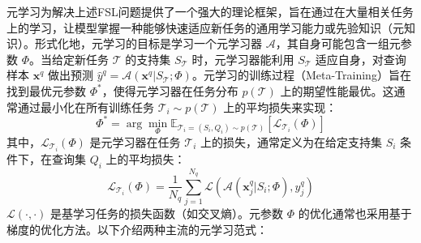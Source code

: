 元学习为解决上述FSL问题提供了一个强大的理论框架，旨在通过在大量相关任务上的学习，让模型掌握一种能够快速适应新任务的通用学习能力或先验知识（元知识）。形式化地，元学习的目标是学习一个元学习器 $\mathcal{A}$，其自身可能包含一组元参数 $\Phi$。当给定新任务 $\mathcal{T}$ 的支持集 $S_{\mathcal{T}}$ 时，元学习器能利用 $S_{\mathcal{T}}$ 适应自身，对查询样本 $\mathbf{x}^q$ 做出预测 $\hat{y}^q = \mathcal{A}(\mathbf{x}^q | S_{\mathcal{T}}; \Phi)$。元学习的训练过程（Meta-Training）旨在找到最优元参数 $\Phi^*$，使得元学习器在任务分布 $p(\mathcal{T})$ 上的期望性能最优。这通常通过最小化在所有训练任务 $\mathcal{T}_i \sim p(\mathcal{T})$ 上的平均损失来实现：
\begin{equation}
    \Phi^* = \arg\min_{\Phi} \mathbb{E}_{\mathcal{T}_i=(S_i, Q_i) \sim p(\mathcal{T})} [\mathcal{L}_{\mathcal{T}_i}(\Phi)]
    \label{eq:meta_objective}
\end{equation}
其中，$\mathcal{L}_{\mathcal{T}_i}(\Phi)$ 是元学习器在任务 $\mathcal{T}_i$ 上的损失，通常定义为在给定支持集 $S_i$ 条件下，在查询集 $Q_i$ 上的平均损失：
\begin{equation}
    \mathcal{L}_{\mathcal{T}_i}(\Phi) = \frac{1}{N_q} \sum_{j=1}^{N_q} \mathcal{L}( \mathcal{A}(\mathbf{x}_j^q | S_i; \Phi), y_j^q )
    \label{eq:task_loss_meta}
\end{equation}
$\mathcal{L}(\cdot, \cdot)$ 是基学习任务的损失函数（如交叉熵）。元参数 $\Phi$ 的优化通常也采用基于梯度的优化方法。以下介绍两种主流的元学习范式：

